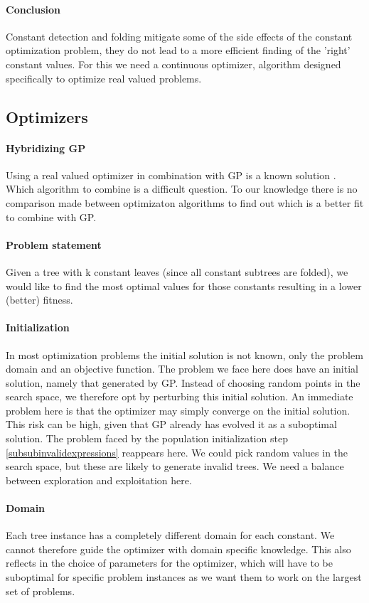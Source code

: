 \paragraph{Conclusion}
Constant detection and folding mitigate some of the side effects of the constant optimization problem, they do not lead to a more efficient finding of the 'right' constant values. For this we need a continuous optimizer, algorithm designed specifically to optimize real valued problems.
\subsection{Optimizers}
\paragraph{Hybridizing GP}
Using a real valued optimizer in combination with GP is a known solution \cite{GEDE, GPConst}.
Which algorithm to combine is a difficult question. To our knowledge there is no comparison made between optimizaton algorithms to find out which is a better fit to combine with GP. 
\paragraph{Problem statement}
Given a tree with k constant leaves (since all constant subtrees are folded), we would like to find the most optimal values for those constants resulting in a lower (better) fitness. 
\paragraph{Initialization}
In most optimization problems the initial solution is not known, only the problem domain and an objective function. The problem we face here does have an initial solution, namely that generated by GP. Instead of choosing random points in the search space, we therefore opt by perturbing this initial solution. An immediate problem here is that the optimizer may simply converge on the initial solution. This risk can be high, given that GP already has evolved it as a suboptimal solution. 
The problem faced by the population initialization step \ref{subsubinvalidexpressions} reappears here. We could pick random values in the search space, but these are likely to generate invalid trees. We need a balance between exploration and exploitation here. 
\paragraph{Domain}
Each tree instance has a completely different domain for each constant. We cannot therefore guide the optimizer with domain specific knowledge. This also reflects in the choice of parameters for the optimizer, which will have to be suboptimal for specific problem instances as we want them to work on the largest set of problems.
